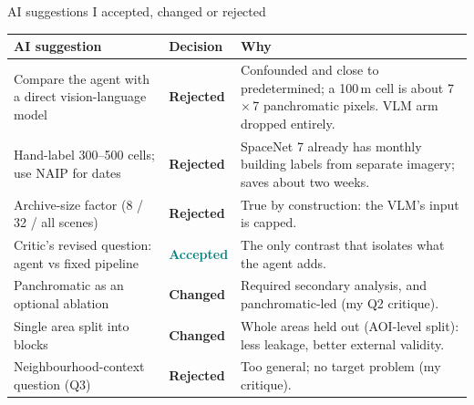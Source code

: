 \documentclass[aspectratio=169,11pt]{beamer}
\newcommand{\acc}{\textcolor{teal}{\textbf{Accepted}}}
\newcommand{\chg}{\textcolor{amber}{\textbf{Changed}}}
\newcommand{\rej}{\textcolor{failred}{\textbf{Rejected}}}
\begin{document}
\begin{frame}[shrink=14]{AI suggestions I accepted, changed or rejected}
\footnotesize
\begin{tabularx}{\textwidth}{@{}p{4.6cm}p{1.6cm}Y@{}}
\toprule
\textbf{AI suggestion} & \textbf{Decision} & \textbf{Why} \\
\midrule
Compare the agent with a direct vision-language model & \rej & Confounded and close to predetermined; a 100\,m cell is about 7\,$\times$\,7 panchromatic pixels. VLM arm dropped entirely. \\
Hand-label 300--500 cells; use NAIP for dates & \rej & SpaceNet 7 already has monthly building labels from separate imagery; saves about two weeks. \\
Archive-size factor (8 / 32 / all scenes) & \rej & True by construction: the VLM's input is capped. \\
Critic's revised question: agent vs fixed pipeline & \acc & The only contrast that isolates what the agent adds. \\
Panchromatic as an optional ablation & \chg & Required secondary analysis, and panchromatic-led (my Q2 critique). \\
Single area split into blocks & \chg & Whole areas held out (AOI-level split): less leakage, better external validity. \\
Neighbourhood-context question (Q3) & \rej & Too general; no target problem (my critique). \\
\bottomrule
\end{tabularx}
\end{frame}
\end{document}
